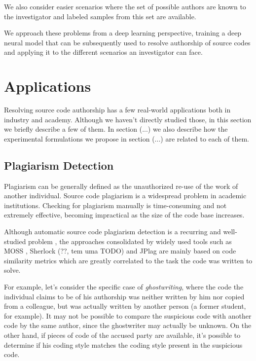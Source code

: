 We also consider easier scenarios where the set of possible authors are known to the investigator and labeled samples from this set are available. %

We approach these problems from a deep learning perspective, training a deep neural model that can be subsequently used to resolve authorship of source codes and applying it to the different scenarios an investigator can face.

\section{Applications}

Resolving source code authorship has a few real-world applications both in industry and academy. Although we haven't directly studied those, in this section we briefly describe a few of them. In section (...) we also describe how the experimental formulations we propose in section (...) are related to each of them.

\subsection{Plagiarism Detection}

Plagiarism can be generally defined as the unauthorized re-use of the work of another individual. Source code plagiarism is a widespread problem in academic institutions. Checking for plagiarism manually is time-consuming and not extremely effective, becoming impractical as the size of the code base increases.

Although automatic source code plagiarism detection is a recurring and well-studied problem \cite{plag_survey}, the approaches consolidated by widely used tools such as MOSS \cite{moss}, Sherlock (??, tem uma TODO) and JPlag \cite{jplag} are mainly based on code similarity metrics which are greatly correlated to the task the code was written to solve.%

For example, let's consider the specific case of \textit{ghostwriting}, where the code the individual claims to be of his authorship was neither written by him nor copied from a colleague, but was actually written by another person (a former student, for example).  It may not be possible to compare the suspicious code with another code by the same author, since the ghostwriter may actually be unknown. On the other hand, if pieces of code of the accused party are available, it's possible to determine if his coding style matches the coding style present in the suspicious code.

